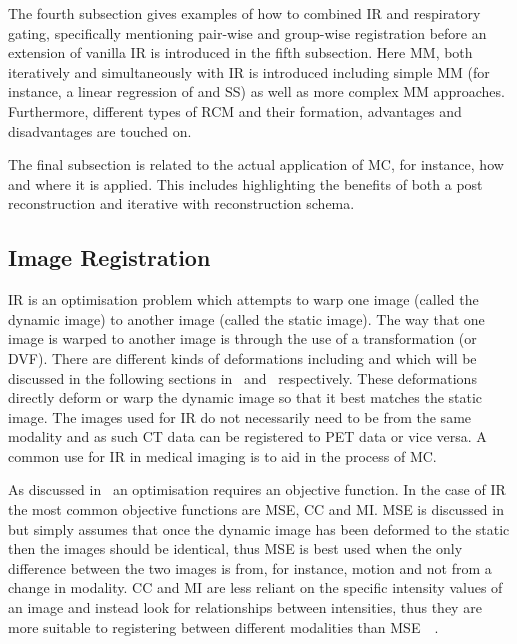         The fourth subsection gives examples of how to combined \gls{IR} and respiratory gating, specifically mentioning pair-wise and group-wise registration before an extension of vanilla \gls{IR} is introduced in the fifth subsection. Here \gls{MM}, both iteratively and simultaneously with \gls{IR} is introduced including simple \gls{MM} (for instance, a linear regression of  and \gls{SS}) as well as more complex \gls{MM} approaches. Furthermore, different types of \gls{RCM} and their formation, advantages and disadvantages are touched on.
        
        The final subsection is related to the actual application of \gls{MC}, for instance, how and where it is applied. This includes highlighting the benefits of both a post reconstruction and iterative with reconstruction schema.
    
        \subsection{Image Registration} \label{sec:image_registration}
            \gls{IR} is an optimisation problem which attempts to warp one image (called the dynamic image) to another image (called the static image). The way that one image is warped to another image is through the use of a transformation (or \gls{DVF}). There are  different kinds of deformations including  and  which will be discussed in the following sections in~ and~ respectively. These deformations directly deform or warp the dynamic image so that it best matches the static image. %
            The images used for \gls{IR} do not necessarily need to be from the same modality and as such \gls{CT} data can be registered to \gls{PET} data or vice versa. A common use for \gls{IR} in medical imaging is to aid in the process of \gls{MC}.
            
            As discussed in~ an optimisation requires an objective function. In the case of \gls{IR} the most common objective functions are \gls{MSE}, \gls{CC} and \gls{MI}. \gls{MSE} is discussed in~ but simply assumes that once the dynamic image has been deformed to the static then the images should be identical, thus \gls{MSE} is best used when the only difference between the two images is from, for instance, motion and not from a change in modality. \gls{CC} and \gls{MI} are less reliant on the specific intensity values of an image and instead look for relationships between intensities, thus they are more suitable to registering between different modalities than \gls{MSE}~~.
            
